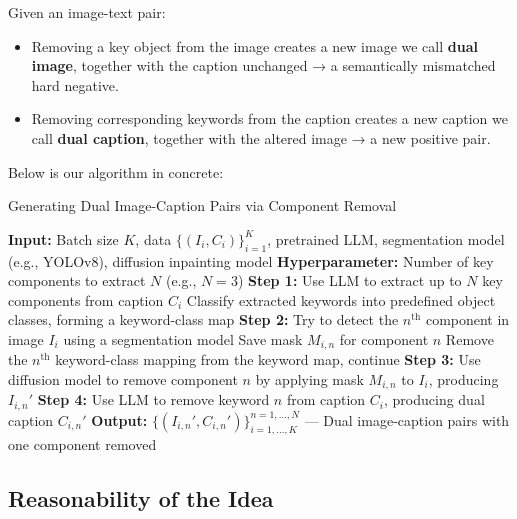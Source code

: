 \documentclass[11pt,letterpaper]{article}
\begin{document}
Given an image-text pair:
\begin{itemize}
    \item Removing a key object from the image creates a new image we call \textbf{dual image}, together with the caption unchanged → a semantically mismatched hard negative.
    \item Removing corresponding keywords from the caption creates a new caption we call \textbf{dual caption}, together with the altered image → a new positive pair.
\end{itemize}


Below is our algorithm in concrete:
\begin{algorithm}[H]
\caption{Generating Dual Image-Caption Pairs via Component Removal}
\begin{algorithmic}[1]
\State \textbf{Input:} Batch size $K$, data $\{(I_i, C_i)\}_{i=1}^K$, pretrained LLM, segmentation model (e.g., YOLOv8), diffusion inpainting model
\State \textbf{Hyperparameter:} Number of key components to extract $N$ (e.g., $N = 3$)
        \State \textbf{Step 1:} Use LLM to extract up to $N$ key components from caption $C_i$
        \State Classify extracted keywords into predefined object classes, forming a keyword-class map
        \State \textbf{Step 2:} Try to detect the $n^{\text{th}}$ component in image $I_i$ using a segmentation model
            \State Save mask $M_{i,n}$ for component $n$
        \Else
            \State Remove the $n^{\text{th}}$ keyword-class mapping from the keyword map, continue
        \EndIf
    \EndFor
        \State \textbf{Step 3:} Use diffusion model to remove component $n$ by applying mask $M_{i,n}$ to $I_i$, producing $I_{i,n}'$
    \EndFor
        \State \textbf{Step 4:} Use LLM to remove keyword $n$ from caption $C_i$, producing dual caption $C_{i,n}'$
    \EndFor
\EndFor
\State \textbf{Output:} $\{(I_{i,n}', C_{i,n}')\}_{i=1,\ldots,K}^{n=1,\ldots,N}$ — Dual image-caption pairs with one component removed
\end{algorithmic}
\end{algorithm}

\subsection{Reasonability of the Idea}
\end{document}

